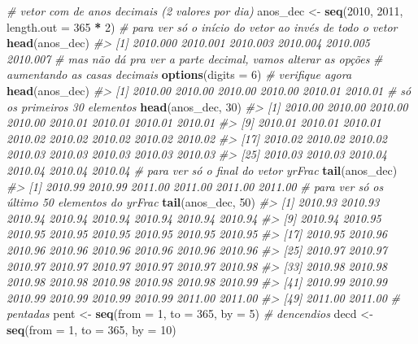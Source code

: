 \documentclass[]{book}
\newenvironment{Shaded}{\begin{snugshade}}{\end{snugshade}}
\newcommand{\KeywordTok}[1]{\textcolor[rgb]{0.13,0.29,0.53}{\textbf{#1}}}
\newcommand{\DataTypeTok}[1]{\textcolor[rgb]{0.13,0.29,0.53}{#1}}
\newcommand{\DecValTok}[1]{\textcolor[rgb]{0.00,0.00,0.81}{#1}}
\newcommand{\StringTok}[1]{\textcolor[rgb]{0.31,0.60,0.02}{#1}}
\newcommand{\CommentTok}[1]{\textcolor[rgb]{0.56,0.35,0.01}{\textit{#1}}}
\newcommand{\OperatorTok}[1]{\textcolor[rgb]{0.81,0.36,0.00}{\textbf{#1}}}
\newcommand{\NormalTok}[1]{#1}
\begin{document}
\begin{Shaded}
\begin{Highlighting}[]
\CommentTok{# vetor com de anos decimais (2 valores por dia)}
\NormalTok{anos_dec <-}\StringTok{ }\KeywordTok{seq}\NormalTok{(}\DecValTok{2010}\NormalTok{, }\DecValTok{2011}\NormalTok{, }\DataTypeTok{length.out =} \DecValTok{365} \OperatorTok{*}\StringTok{ }\DecValTok{2}\NormalTok{)}
\CommentTok{# para ver só o início do vetor ao invés de todo o vetor}
\KeywordTok{head}\NormalTok{(anos_dec)}
\CommentTok{#> [1] 2010.000 2010.001 2010.003 2010.004 2010.005 2010.007}
\CommentTok{# mas não dá pra ver a parte decimal, vamos alterar as opções}
\CommentTok{# aumentando as casas decimais}
\KeywordTok{options}\NormalTok{(}\DataTypeTok{digits =} \DecValTok{6}\NormalTok{)}
\CommentTok{# verifique agora}
\KeywordTok{head}\NormalTok{(anos_dec)}
\CommentTok{#> [1] 2010.00 2010.00 2010.00 2010.00 2010.01 2010.01}
\CommentTok{# só os primeiros 30 elementos}
\KeywordTok{head}\NormalTok{(anos_dec, }\DecValTok{30}\NormalTok{)}
\CommentTok{#>  [1] 2010.00 2010.00 2010.00 2010.00 2010.01 2010.01 2010.01 2010.01}
\CommentTok{#>  [9] 2010.01 2010.01 2010.01 2010.02 2010.02 2010.02 2010.02 2010.02}
\CommentTok{#> [17] 2010.02 2010.02 2010.02 2010.03 2010.03 2010.03 2010.03 2010.03}
\CommentTok{#> [25] 2010.03 2010.03 2010.04 2010.04 2010.04 2010.04}
\CommentTok{# para ver só o final do vetor yrFrac}
\KeywordTok{tail}\NormalTok{(anos_dec)}
\CommentTok{#> [1] 2010.99 2010.99 2011.00 2011.00 2011.00 2011.00}
\CommentTok{# para ver só os último 50 elementos do yrFrac}
\KeywordTok{tail}\NormalTok{(anos_dec, }\DecValTok{50}\NormalTok{)}
\CommentTok{#>  [1] 2010.93 2010.93 2010.94 2010.94 2010.94 2010.94 2010.94 2010.94}
\CommentTok{#>  [9] 2010.94 2010.95 2010.95 2010.95 2010.95 2010.95 2010.95 2010.95}
\CommentTok{#> [17] 2010.95 2010.96 2010.96 2010.96 2010.96 2010.96 2010.96 2010.96}
\CommentTok{#> [25] 2010.97 2010.97 2010.97 2010.97 2010.97 2010.97 2010.97 2010.98}
\CommentTok{#> [33] 2010.98 2010.98 2010.98 2010.98 2010.98 2010.98 2010.98 2010.99}
\CommentTok{#> [41] 2010.99 2010.99 2010.99 2010.99 2010.99 2010.99 2011.00 2011.00}
\CommentTok{#> [49] 2011.00 2011.00}
\CommentTok{# pentadas}
\NormalTok{pent <-}\StringTok{ }\KeywordTok{seq}\NormalTok{(}\DataTypeTok{from =} \DecValTok{1}\NormalTok{, }\DataTypeTok{to =} \DecValTok{365}\NormalTok{, }\DataTypeTok{by =} \DecValTok{5}\NormalTok{)}
\CommentTok{# dencendios}
\NormalTok{decd <-}\StringTok{ }\KeywordTok{seq}\NormalTok{(}\DataTypeTok{from =} \DecValTok{1}\NormalTok{, }\DataTypeTok{to =} \DecValTok{365}\NormalTok{, }\DataTypeTok{by =} \DecValTok{10}\NormalTok{)}

\end{Highlighting}
\end{Shaded}
\end{document}
